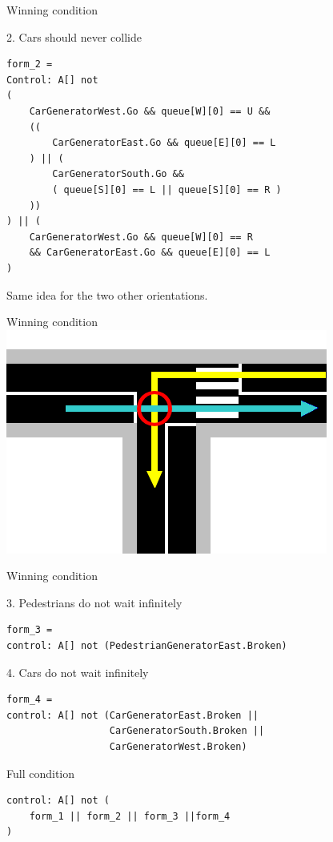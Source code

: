 \documentclass{bredelebeamer}
\begin{document}
\begin{frame}[fragile]{Winning condition}
\begin{block}{2. Cars should never collide}
\begin{verbatim}
form_2 = 
Control: A[] not
(
    CarGeneratorWest.Go && queue[W][0] == U && 
    ((
        CarGeneratorEast.Go && queue[E][0] == L
    ) || (
        CarGeneratorSouth.Go && 
        ( queue[S][0] == L || queue[S][0] == R )
    ))
) || (
    CarGeneratorWest.Go && queue[W][0] == R 
    && CarGeneratorEast.Go && queue[E][0] == L
)
\end{verbatim}

Same idea for the two other orientations.
\end{block}

\end{frame}
\begin{frame}[fragile]{Winning condition}
\centering
\includegraphics[scale=0.8]{images/exempleCollision.png}

\end{frame}


\begin{frame}[fragile]{Winning condition}
\begin{block}{3. Pedestrians do not wait infinitely}
\begin{verbatim}
form_3 = 
control: A[] not (PedestrianGeneratorEast.Broken)
\end{verbatim}
\end{block}

\begin{block}{4. Cars do not wait infinitely}
\begin{verbatim}
form_4 = 
control: A[] not (CarGeneratorEast.Broken ||
                  CarGeneratorSouth.Broken ||
                  CarGeneratorWest.Broken)
\end{verbatim}
\end{block}
\begin{block}{Full condition}
\begin{verbatim}
control: A[] not (
    form_1 || form_2 || form_3 ||form_4
)
\end{verbatim}
\end{block}
\end{frame} 
\end{document}
